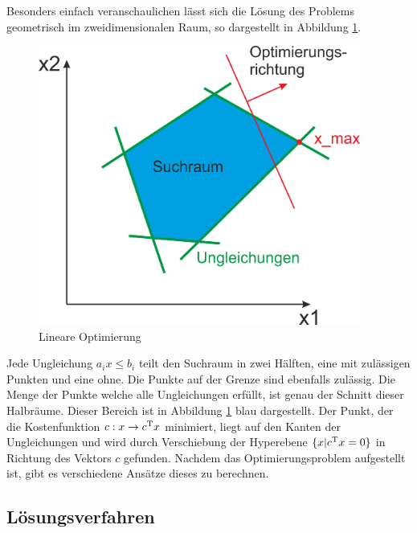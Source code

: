 \documentclass{like}
\begin{document}
Besonders einfach veranschaulichen lässt sich die Lösung des Problems geometrisch im zweidimensionalen Raum, so dargestellt in Abbildung \ref*{fig:linOpt}.

\begin{figure}[ht!]
	\centering
	\includegraphics[width=300pt]{Abbildungen/linearOpt.png}
	\caption{Lineare Optimierung}
	\label{fig:linOpt}
\end{figure}

Jede Ungleichung $a_i x \leq b_i$ teilt den Suchraum in zwei Hälften, eine mit zulässigen Punkten und eine ohne. Die Punkte auf der Grenze sind ebenfalls zulässig. Die Menge der Punkte welche alle Ungleichungen erfüllt, ist genau der Schnitt dieser Halbräume. Dieser Bereich ist in Abbildung \ref{fig:linOpt} blau dargestellt. Der Punkt, der die Kostenfunktion $c: x \rightarrow c\textsuperscript{T} x$ minimiert, liegt auf den Kanten der Ungleichungen und wird durch Verschiebung der Hyperebene $ \{x| c\textsuperscript{T} x = 0 \}$ in Richtung des Vektors \(c\) gefunden. Nachdem das Optimierungsproblem aufgestellt ist, gibt es verschiedene Ansätze dieses zu berechnen.


\subsection*{Lösungsverfahren}
\end{document}
